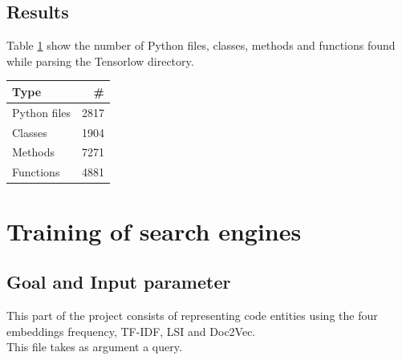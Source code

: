 \documentclass [14 pt]{article}
\begin{document}
\subsection{Results}
Table \ref{tab:DataExtraction} show the number of Python files, classes, methods and functions found while parsing the Tensorlow directory.

\begin{table}[h]
\centering
\begin{tabular}{| l r |}
\hline
\textbf{Type}	&  \textbf{\#}	\\ \hline\hline
Python files 	&	2817	\\
Classes			&	1904	\\
Methods			&	7271	\\
Functions		&	4881	\\ \hline
\end{tabular}
\label{tab:DataExtraction}
\end{table}

\section{Training of search engines} %
\subsection{Goal and Input parameter} %
This part of the project consists of representing code entities using the four embeddings frequency, TF-IDF, LSI and Doc2Vec.\\
This file takes as argument a query.
\end{document}

